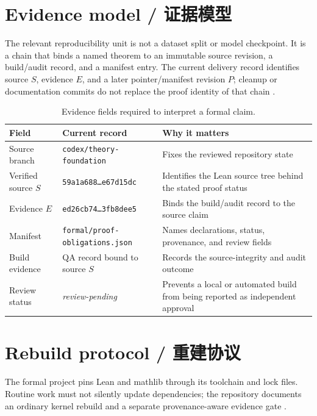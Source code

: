 \label{ch:methods}

\section{Evidence model / 证据模型}

The relevant reproducibility unit is not a dataset split or model checkpoint. It is a chain that
binds a named theorem to an immutable source revision, a build/audit record, and a manifest entry.
The current delivery record identifies source \(S\), evidence \(E\), and a later pointer/manifest
revision \(P\); cleanup or documentation commits do not replace the proof identity of that chain
\citep{cantiluneClosure}.

\begin{table}[H]
\centering
\caption{Evidence fields required to interpret a formal claim.}
\label{tab:manifest}
\begin{tabularx}{\textwidth}{@{}L{0.26\textwidth}Y L{0.26\textwidth}@{}}
\toprule
{}
\textbf{Field} & \textbf{Current record} & \textbf{Why it matters} \\
\midrule
Source branch & \texttt{codex/theory-foundation} & Fixes the reviewed repository state \\
Verified source \(S\) & \texttt{59a1a688\ldots e67d15dc} & Identifies the Lean source tree behind the stated proof status \\
Evidence \(E\) & \texttt{ed26cb74\ldots 3fb8dee5} & Binds the build/audit record to the source claim \\
Manifest & \texttt{formal/proof-obligations.json} & Names declarations, status, provenance, and review fields \\
Build evidence & QA record bound to source \(S\) & Records the source-integrity and audit outcome \\
Review status & \emph{review-pending} & Prevents a local or automated build from being reported as independent approval \\
\bottomrule
\end{tabularx}
\end{table}

\section{Rebuild protocol / 重建协议}

The formal project pins Lean and mathlib through its toolchain and lock files. Routine work must
not silently update dependencies; the repository documents an ordinary kernel rebuild and a
separate provenance-aware evidence gate \citep{cantiluneFormalReadme}.

